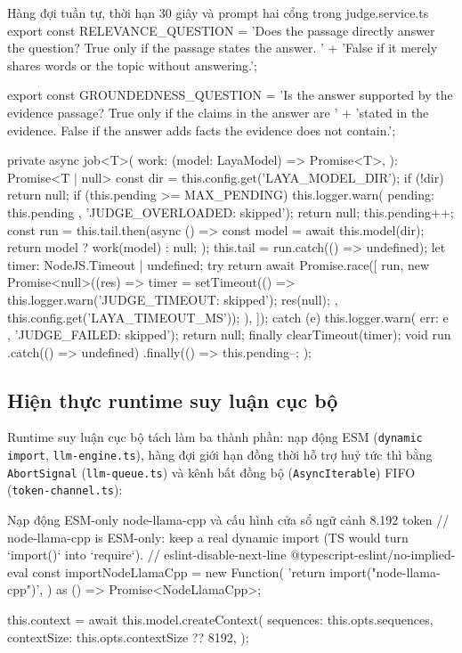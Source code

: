 \begin{tsbox}{Hàng đợi tuần tự, thời hạn 30 giây và prompt hai cổng trong judge.service.ts}
export const RELEVANCE_QUESTION =
  'Does the passage directly answer the question? True only if the passage states the answer. ' +
  'False if it merely shares words or the topic without answering.';

export const GROUNDEDNESS_QUESTION =
  'Is the answer supported by the evidence passage? True only if the claims in the answer are ' +
  'stated in the evidence. False if the answer adds facts the evidence does not contain.';

private async job<T>(
  work: (model: LayaModel) => Promise<T>,
): Promise<T | null> {
  const dir = this.config.get('LAYA_MODEL_DIR');
  if (!dir) return null;
  if (this.pending >= MAX_PENDING) {
    this.logger.warn({ pending: this.pending }, 'JUDGE_OVERLOADED: skipped');
    return null;
  }
  this.pending++;
  const run = this.tail.then(async () => {
    const model = await this.model(dir);
    return model ? work(model) : null;
  });
  this.tail = run.catch(() => undefined);
  let timer: NodeJS.Timeout | undefined;
  try {
    return await Promise.race([
      run,
      new Promise<null>((res) => {
        timer = setTimeout(() => {
          this.logger.warn('JUDGE_TIMEOUT: skipped');
          res(null);
        }, this.config.get('LAYA_TIMEOUT_MS'));
      }),
    ]);
  } catch (e) {
    this.logger.warn({ err: e }, 'JUDGE_FAILED: skipped');
    return null;
  } finally {
    clearTimeout(timer);
    void run
      .catch(() => undefined)
      .finally(() => {
        this.pending--;
      });
  }
}
\end{tsbox}

\subsection{Hiện thực runtime suy luận cục bộ}
\label{subsec:runtime-suy-luan}

Runtime suy luận cục bộ tách làm ba thành phần: nạp động ESM (\texttt{dynamic import}, \texttt{llm-\allowbreak{}engine.\allowbreak{}ts}), hàng đợi giới hạn đồng thời hỗ trợ huỷ tức thì bằng \texttt{AbortSignal} (\texttt{llm-\allowbreak{}queue.\allowbreak{}ts}) và kênh bất đồng bộ (\texttt{AsyncIterable}) FIFO (\texttt{token-\allowbreak{}channel.\allowbreak{}ts}):

\begin{tsbox}{Nạp động ESM-only node-llama-cpp và cấu hình cửa sổ ngữ cảnh 8.192 token}
// node-llama-cpp is ESM-only: keep a real dynamic import (TS would turn `import()` into `require`).
// eslint-disable-next-line @typescript-eslint/no-implied-eval
const importNodeLlamaCpp = new Function(
  'return import("node-llama-cpp")',
) as () => Promise<NodeLlamaCpp>;

this.context = await this.model.createContext({
  sequences: this.opts.sequences,
  contextSize: this.opts.contextSize ?? 8192,
});
\end{tsbox}

